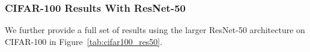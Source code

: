 


\subsubsection{CIFAR-100 Results With ResNet-50}

We further provide a full set of results using the larger ResNet-50 architecture on CIFAR-100 in Figure~\ref{tab:cifar100_res50}.

